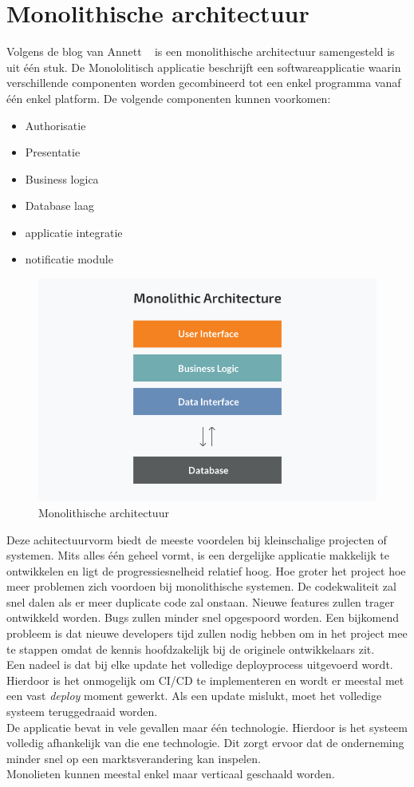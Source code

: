 \section{Monolithische architectuur}
Volgens de blog van Annett ~\autocite{Monolith2014} is een monolithische architectuur samengesteld is uit één stuk. De Monololitisch applicatie beschrijft een softwareapplicatie waarin verschillende componenten worden gecombineerd tot een enkel programma vanaf één enkel platform. De volgende componenten kunnen voorkomen:
\begin{itemize}
    \item Authorisatie
    \item Presentatie
    \item Business logica
    \item Database laag
    \item applicatie integratie
    \item notificatie module
\end{itemize}
\begin{figure}[!htb]
    \caption{Monolithische architectuur}
    \centering
    \includegraphics[width=1\textwidth]{Monoliet.png}
\end{figure}
Deze achitectuurvorm biedt de meeste voordelen bij kleinschalige projecten of systemen. Mits alles één geheel vormt, is een dergelijke applicatie makkelijk te ontwikkelen en ligt de progressiesnelheid relatief hoog. Hoe groter het project hoe meer problemen zich voordoen bij monolithische systemen. De codekwaliteit zal snel dalen als er meer duplicate code zal onstaan. Nieuwe features zullen trager ontwikkeld worden. Bugs zullen minder snel opgespoord worden. Een bijkomend probleem is dat nieuwe developers tijd zullen nodig hebben om in het project mee te stappen omdat de kennis hoofdzakelijk bij de originele ontwikkelaars zit. \\
Een nadeel is dat bij elke update het volledige deployprocess uitgevoerd wordt. Hierdoor is het onmogelijk om CI/CD te implementeren en wordt er meestal met een vast \emph{deploy} moment gewerkt. Als een update mislukt, moet het volledige systeem teruggedraaid worden.\\
De applicatie bevat in vele gevallen maar één technologie. Hierdoor is het systeem volledig afhankelijk van die ene technologie. Dit zorgt ervoor dat de onderneming minder snel op een marktsverandering kan inspelen.\\
Monolieten kunnen meestal enkel maar verticaal geschaald worden.
